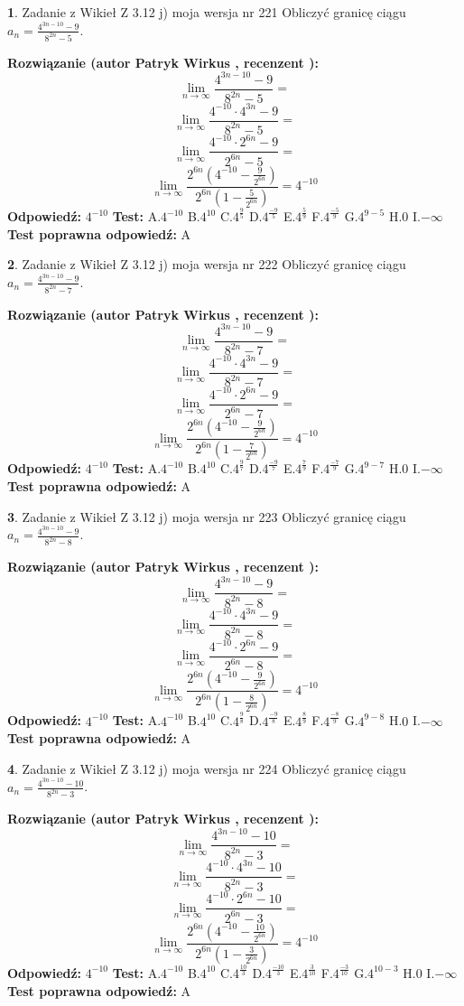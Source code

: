 \documentclass[12pt, a4paper]{article}
\theoremstyle{definition} %
\newtheorem{zad}{}
\newcommand{\zadStart}[1]{\begin{zad}#1\newline}
\newcommand{\zadStop}{\end{zad}}
\newcommand{\rozwStart}[2]{\noindent \textbf{Rozwiązanie (autor #1 , recenzent #2): }\newline}
\newcommand{\rozwStop}{\newline}
\newcommand{\odpStart}{\noindent \textbf{Odpowiedź:}\newline}
\newcommand{\odpStop}{\newline}
\newcommand{\testStart}{\noindent \textbf{Test:}\newline}
\newcommand{\testStop}{\newline}
\newcommand{\kluczStart}{\noindent \textbf{Test poprawna odpowiedź:}\newline}
\newcommand{\kluczStop}{\newline}
\begin{document}
\zadStart{Zadanie z Wikieł Z 3.12 j) moja wersja nr 221}
Obliczyć granicę ciągu $a_{n}=\frac{4^{3n-10}-9}{8^{2n}-5}$.
\zadStop
\rozwStart{Patryk Wirkus}{}
$$\lim\limits_{n\to\infty}\frac{4^{3n-10}-9}{8^{2n}-5}=$$
$$\lim\limits_{n\to\infty}\frac{4^{-10} \cdot 4^{3n}-9}{8^{2n}-5}=$$
$$\lim\limits_{n\to\infty}\frac{4^{-10} \cdot 2^{6n}-9}{2^{6n}-5}=$$
$$\lim\limits_{n\to\infty}\frac{2^{6n}(4^{-10} - \frac{9}{2^{6n}})}{2^{6n}(1-\frac{5}{2^{6n}})}= 4^{-10}$$
\rozwStop
\odpStart
$4^{-10}$
\odpStop
\testStart
A.$4^{-10}$
B.$4^{10}$
C.$4^{\frac{9}{5}}$
D.$4^{\frac{-9}{5}}$
E.$4^{\frac{5}{9}}$
F.$4^{\frac{-5}{9}}$
G.$4^{9-5}$
H.$0$
I.$-\infty$
\testStop
\kluczStart
A
\kluczStop



\zadStart{Zadanie z Wikieł Z 3.12 j) moja wersja nr 222}
Obliczyć granicę ciągu $a_{n}=\frac{4^{3n-10}-9}{8^{2n}-7}$.
\zadStop
\rozwStart{Patryk Wirkus}{}
$$\lim\limits_{n\to\infty}\frac{4^{3n-10}-9}{8^{2n}-7}=$$
$$\lim\limits_{n\to\infty}\frac{4^{-10} \cdot 4^{3n}-9}{8^{2n}-7}=$$
$$\lim\limits_{n\to\infty}\frac{4^{-10} \cdot 2^{6n}-9}{2^{6n}-7}=$$
$$\lim\limits_{n\to\infty}\frac{2^{6n}(4^{-10} - \frac{9}{2^{6n}})}{2^{6n}(1-\frac{7}{2^{6n}})}= 4^{-10}$$
\rozwStop
\odpStart
$4^{-10}$
\odpStop
\testStart
A.$4^{-10}$
B.$4^{10}$
C.$4^{\frac{9}{7}}$
D.$4^{\frac{-9}{7}}$
E.$4^{\frac{7}{9}}$
F.$4^{\frac{-7}{9}}$
G.$4^{9-7}$
H.$0$
I.$-\infty$
\testStop
\kluczStart
A
\kluczStop



\zadStart{Zadanie z Wikieł Z 3.12 j) moja wersja nr 223}
Obliczyć granicę ciągu $a_{n}=\frac{4^{3n-10}-9}{8^{2n}-8}$.
\zadStop
\rozwStart{Patryk Wirkus}{}
$$\lim\limits_{n\to\infty}\frac{4^{3n-10}-9}{8^{2n}-8}=$$
$$\lim\limits_{n\to\infty}\frac{4^{-10} \cdot 4^{3n}-9}{8^{2n}-8}=$$
$$\lim\limits_{n\to\infty}\frac{4^{-10} \cdot 2^{6n}-9}{2^{6n}-8}=$$
$$\lim\limits_{n\to\infty}\frac{2^{6n}(4^{-10} - \frac{9}{2^{6n}})}{2^{6n}(1-\frac{8}{2^{6n}})}= 4^{-10}$$
\rozwStop
\odpStart
$4^{-10}$
\odpStop
\testStart
A.$4^{-10}$
B.$4^{10}$
C.$4^{\frac{9}{8}}$
D.$4^{\frac{-9}{8}}$
E.$4^{\frac{8}{9}}$
F.$4^{\frac{-8}{9}}$
G.$4^{9-8}$
H.$0$
I.$-\infty$
\testStop
\kluczStart
A
\kluczStop



\zadStart{Zadanie z Wikieł Z 3.12 j) moja wersja nr 224}
Obliczyć granicę ciągu $a_{n}=\frac{4^{3n-10}-10}{8^{2n}-3}$.
\zadStop
\rozwStart{Patryk Wirkus}{}
$$\lim\limits_{n\to\infty}\frac{4^{3n-10}-10}{8^{2n}-3}=$$
$$\lim\limits_{n\to\infty}\frac{4^{-10} \cdot 4^{3n}-10}{8^{2n}-3}=$$
$$\lim\limits_{n\to\infty}\frac{4^{-10} \cdot 2^{6n}-10}{2^{6n}-3}=$$
$$\lim\limits_{n\to\infty}\frac{2^{6n}(4^{-10} - \frac{10}{2^{6n}})}{2^{6n}(1-\frac{3}{2^{6n}})}= 4^{-10}$$
\rozwStop
\odpStart
$4^{-10}$
\odpStop
\testStart
A.$4^{-10}$
B.$4^{10}$
C.$4^{\frac{10}{3}}$
D.$4^{\frac{-10}{3}}$
E.$4^{\frac{3}{10}}$
F.$4^{\frac{-3}{10}}$
G.$4^{10-3}$
H.$0$
I.$-\infty$
\testStop
\kluczStart
A
\kluczStop
\end{document}
